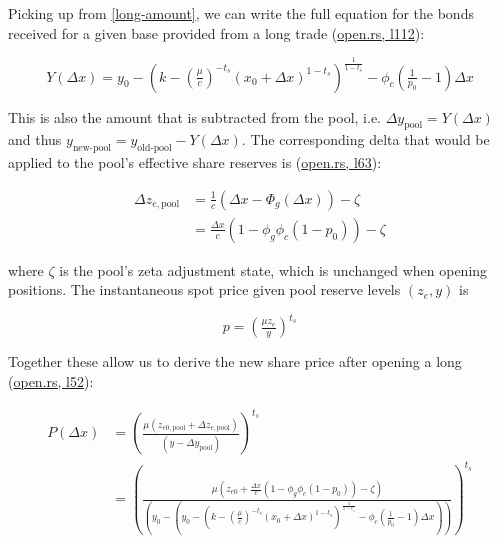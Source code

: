 Picking up from \eqref{long-amount}, we can write the full equation for the bonds received for a given base provided from a long trade (\href{https://github.com/delvtech/hyperdrive/blob/c167ab4b35722388c3d75ac012cbb262cba00a77/crates/hyperdrive-math/src/long/open.rs#L12}{open.rs, l112}):

\begin{equation}
    Y(\Delta x) = y_{0} - \left( k - \left( \tfrac{\mu}{c} \right)^{- t_{s}} \left( x_{0} + \Delta x \right)^{1 - t_{s}} \right)^{\tfrac{1}{1 - t_{s}}} - \phi_{c} \left( \tfrac{1}{p_{0}} - 1 \right) \Delta x
\end{equation}

This is also the amount that is subtracted from the pool, i.e. $\Delta y_{\text{pool}} = Y(\Delta x)$ and thus $y_{\text{new-pool}} = y_{\text{old-pool}} - Y(\Delta x)$.
The corresponding delta that would be applied to the pool's effective share reserves is (\href{https://github.com/delvtech/hyperdrive/blob/c167ab4b35722388c3d75ac012cbb262cba00a77/crates/hyperdrive-math/src/long/open.rs#L63}{open.rs, l63}):

\begin{equation}
\begin{aligned}
\Delta z_{e, \text{pool}} &= \tfrac{1}{c} \left( \Delta x - \Phi_{g}(\Delta x) \right) - \zeta \\
&= \tfrac{\Delta x}{c} \left( 1 - \phi_{g} \phi_{c} \left( 1 - p_{0} \right) \right) - \zeta
\end{aligned}
\end{equation}

where $\zeta$ is the pool's zeta adjustment state, which is unchanged when opening positions.
The instantaneous spot price given pool reserve levels $(z_{e}, y)$ is

\begin{equation}
p = \left( \tfrac{\mu z_{e}}{y} \right)^{t_{s}}
\end{equation}

Together these allow us to derive the new share price after opening a long (\href{https://github.com/delvtech/hyperdrive/blob/18dfd4aa5a7f8d19bd34d9693aadf773995b1b14/crates/hyperdrive-math/src/long/open.rs#L52}{open.rs, l52}):

\begin{equation}
\begin{aligned}
P(\Delta x) &= \left( \tfrac{\mu \left( z_{e0, \text{pool}} + \Delta z_{e, \text{pool}} \right)}{\left( y - \Delta y_{\text{pool}} \right)} \right)^{t_{s}} \\
&= \left( \tfrac{\mu \left( z_{e0} + \tfrac{\Delta x}{c} \left( 1 - \phi_{g} \phi_{c} \left( 1 - p_{0} \right) \right) - \zeta \right)}{\left( y_{0} - \left( y_{0} - \left( k - \left( \tfrac{\mu}{c} \right)^{- t_{s}} \left( x_{0} + \Delta x \right)^{1 - t_{s}} \right)^{\tfrac{1}{1 - t_{s}}} - \phi_{c} \left( \tfrac{1}{p_{0}} - 1 \right) \Delta x \right) \right)} \right)^{t_{s}} \\
\end{aligned}
\end{equation}

